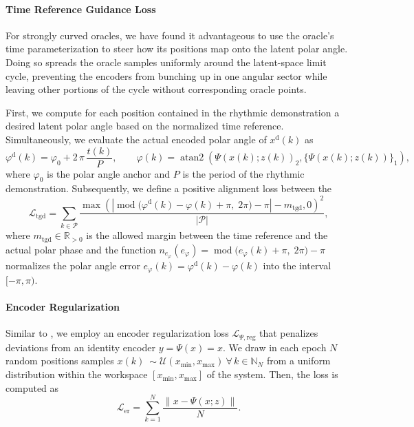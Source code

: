 \paragraph{Time Reference Guidance Loss}
For strongly curved oracles, we have found it advantageous to use the oracle’s time parameterization to steer how its positions map onto the latent polar angle. Doing so spreads the oracle samples uniformly around the latent-space limit cycle, preventing the encoders from bunching up in one angular sector while leaving other portions of the cycle without corresponding oracle points.

First, we compute for each position contained in the rhythmic demonstration a desired latent polar angle based on the normalized time reference. Simultaneously, we evaluate the actual encoded polar angle of $x^\mathrm{d}(k)$ as
\begin{equation}
     \varphi^\mathrm{d}(k) = \varphi_0 + 2 \, \pi \, \frac{t(k)}{P},
     \qquad
     \varphi(k) = \operatorname{atan2}\left ( \Psi(x(k);z(k))_2, \{ \Psi(x(k);z(k)) \}_1 \right),
\end{equation}
where $\varphi_0$ is the polar angle anchor and $P$ is the period of the rhythmic demonstration.
Subsequently, we define a positive alignment loss between the 
\begin{equation}
    \mathcal{L}_\mathrm{tgd} = \sum_{k \in \mathcal{P}} \frac{\max \left ( \left | \operatorname{mod} \bigl( \varphi^\mathrm{d}(k) - \varphi(k) + \pi,\; 2\pi\bigr) - \pi \right | - m_\mathrm{tgd}, 0 \right )^2}{|\mathcal{P}|},
\end{equation}
where $m_\mathrm{tgd} \in \mathbb{R}_{>0}$ is the allowed margin between the time reference and the actual polar phase and the function $n_{e_\varphi}(e_\varphi) = \operatorname{mod} \bigl( e_\varphi(k) + \pi,\; 2\pi\bigr) - \pi$ normalizes the polar angle error $e_\varphi(k) = \varphi^\mathrm{d}(k) - \varphi(k) $ into the interval $[-\pi, \pi)$.

\paragraph{Encoder Regularization}
Similar to \citet{zhi2024teaching}, we employ an encoder regularization loss $\mathcal{L}_{\Psi, \mathrm{reg}}$ that penalizes deviations from an identity encoder $y = \Psi(x) = x$.
We draw in each epoch $N$ random positions samples $x(k) ~\sim \mathcal{U}(x_\mathrm{min}, x_\mathrm{max}) \: \forall \, k \in \mathbb{N}_N$ from a uniform distribution within the workspace $[x_\mathrm{min}, x_\mathrm{max}]$ of the system. Then, the loss is computed as
\begin{equation}
    \mathcal{L}_{\mathrm{er}} = \sum_{k=1}^{N} \frac{\lVert x - \Psi(x;z) \rVert}{N}.
\end{equation}


